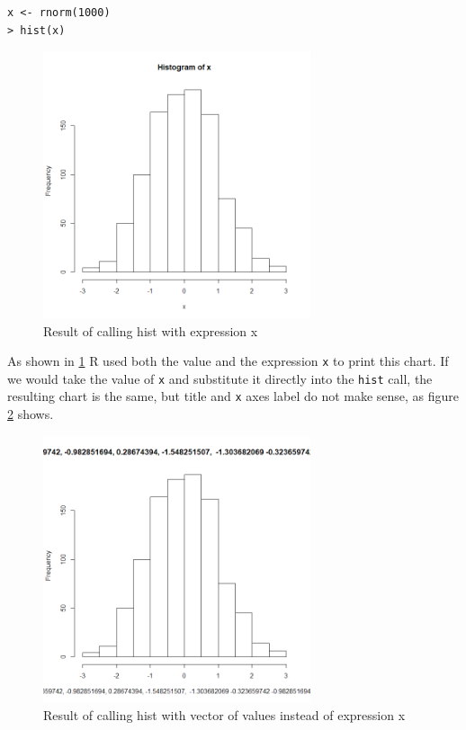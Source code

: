 \documentclass[thesis=B,english]{FITthesis}[2012/10/20]
\begin{document}
\begin{verbatim}
x <- rnorm(1000)
> hist(x)
\end{verbatim}

\begin{figure}\centering
    \includegraphics[width=0.7\textwidth]{img/hist.png}
	\caption[Result of calling hist with expression x]{Result of calling hist with expression x}\label{fig:hist1}
\end{figure}

As shown in \ref{fig:hist1} R used both the value and the expression \verb|x| to print this chart. If we would take the value of \verb|x| and substitute it directly into the \verb|hist| call, the resulting chart is the same, but title and \verb|x| axes label do not make sense, as figure \ref{fig:hist2} shows.

\begin{figure}\centering
    \includegraphics[width=0.7\textwidth]{img/hist2.png}
	\caption[Result of calling hist with vector of values instead of expression x]{Result of calling hist with vector of values instead of expression x}\label{fig:hist2}
\end{figure}
\end{document}
